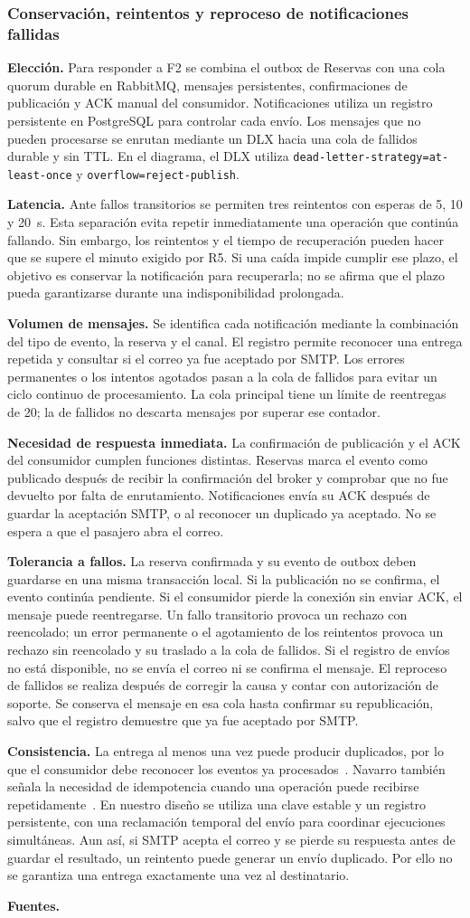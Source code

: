 \documentclass[11pt,a4paper]{article}
\newcommand{\decision}[8]{\subsubsection*{#1}%
  \textbf{Elección.} #2\par
  \textbf{Latencia.} #3\par
  \textbf{Volumen de mensajes.} #4\par
  \textbf{Necesidad de respuesta inmediata.} #5\par
  \textbf{Tolerancia a fallos.} #6\par
  \textbf{Consistencia.} #7\par
  \textbf{Fuentes.} #8\par}
\begin{document}
\decision{Conservación, reintentos y reproceso de notificaciones fallidas}
{Para responder a F2 se combina el outbox de Reservas con
una cola quorum durable en RabbitMQ, mensajes persistentes,
confirmaciones de publicación y ACK manual del consumidor.
Notificaciones utiliza un registro persistente en PostgreSQL
para controlar cada envío. Los mensajes que no pueden
procesarse se enrutan mediante un DLX hacia una cola de
fallidos durable y sin TTL. En el diagrama, el DLX utiliza
\texttt{dead-letter-strategy=at-least-once} y
\texttt{overflow=reject-publish}.}
{Ante fallos transitorios se permiten tres reintentos con
esperas de 5, 10 y 20~s. Esta separación evita repetir
inmediatamente una operación que continúa fallando.
Sin embargo, los reintentos y el tiempo de recuperación
pueden hacer que se supere el minuto exigido por R5.
Si una caída impide cumplir ese plazo, el objetivo es
conservar la notificación para recuperarla; no se afirma
que el plazo pueda garantizarse durante una indisponibilidad
prolongada.}
{Se identifica cada notificación mediante la combinación
del tipo de evento, la reserva y el canal. El registro
permite reconocer una entrega repetida y consultar si
el correo ya fue aceptado por SMTP. Los errores permanentes
o los intentos agotados pasan a la cola de fallidos para
evitar un ciclo continuo de procesamiento. La cola principal
tiene un límite de reentregas de 20; la de fallidos no
descarta mensajes por superar ese contador.}
{La confirmación de publicación y el ACK del consumidor
cumplen funciones distintas. Reservas marca el evento como
publicado después de recibir la confirmación del broker y
comprobar que no fue devuelto por falta de enrutamiento.
Notificaciones envía su ACK después de guardar la aceptación
SMTP, o al reconocer un duplicado ya aceptado. No se espera
a que el pasajero abra el correo.}
{La reserva confirmada y su evento de outbox deben guardarse
en una misma transacción local. Si la publicación no se
confirma, el evento continúa pendiente. Si el consumidor
pierde la conexión sin enviar ACK, el mensaje puede
reentregarse. Un fallo transitorio provoca un rechazo con
reencolado; un error permanente o el agotamiento de los
reintentos provoca un rechazo sin reencolado y su traslado
a la cola de fallidos. Si el registro de envíos no está
disponible, no se envía el correo ni se confirma el mensaje.
El reproceso de fallidos se realiza después de corregir
la causa y contar con autorización de soporte. Se conserva
el mensaje en esa cola hasta confirmar su republicación,
salvo que el registro demuestre que ya fue aceptado por SMTP.}
{La entrega al menos una vez puede producir duplicados,
por lo que el consumidor debe reconocer los eventos ya
procesados~\cite{laigner2025}. Navarro también
señala la necesidad de idempotencia cuando una operación
puede recibirse repetidamente~\cite{navarro2025}.
En nuestro diseño se utiliza una clave estable y un registro
persistente, con una reclamación temporal del envío para
coordinar ejecuciones simultáneas. Aun así, si SMTP acepta
el correo y se pierde su respuesta antes de guardar el
resultado, un reintento puede generar un envío duplicado.
Por ello no se garantiza una entrega exactamente una vez
al destinatario.}
{\cite{laigner2025,navarro2025}}
\end{document}
